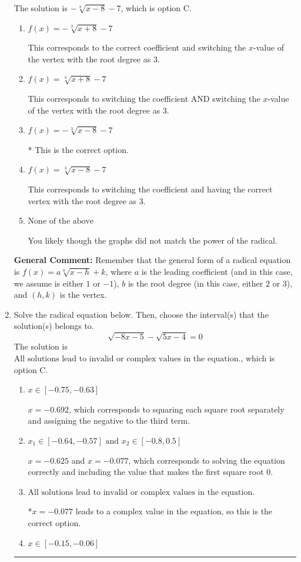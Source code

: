 \documentclass{extbook}[14pt]
\newcommand{\litem}[1]{\item #1

\rule{\textwidth}{0.4pt}}
\begin{document}
\begin{enumerate}
{The solution is \( - \sqrt[3]{x - 8} - 7 \), which is option C.\begin{enumerate}[label=\Alph*.]
\item \( f(x) = - \sqrt[3]{x + 8} - 7 \)

This corresponds to the correct coefficient and switching the $x$-value of the vertex with the root degree as $3$.
\item \( f(x) = \sqrt[3]{x + 8} - 7 \)

This corresponds to switching the coefficient AND switching the $x$-value of the vertex with the root degree as $3$.
\item \( f(x) = - \sqrt[3]{x - 8} - 7 \)

* This is the correct option.
\item \( f(x) = \sqrt[3]{x - 8} - 7 \)

This corresponds to switching the coefficient and having the correct vertex with the root degree as $3$.
\item \( \text{None of the above} \)

You likely though the graphs did not match the power of the radical.
\end{enumerate}

\textbf{General Comment:} Remember that the general form of a radical equation is $ f(x) = a \sqrt[b]{x - h} + k$, where $a$ is the leading coefficient (and in this case, we assume is either $1$ or $-1$), $b$ is the root degree (in this case, either $2$ or $3$), and $(h, k)$ is the vertex.
}
\litem{
Solve the radical equation below. Then, choose the interval(s) that the solution(s) belongs to.
\[ \sqrt{-8 x - 5} - \sqrt{5 x - 4} = 0 \]
The solution is \( \text{All solutions lead to invalid or complex values in the equation.} \), which is option C.\begin{enumerate}[label=\Alph*.]
\item \( x \in [-0.75,-0.63] \)

$x = -0.692$, which corresponds to squaring each square root separately and assigning the negative to the third term.
\item \( x_1 \in [-0.64, -0.57] \text{ and } x_2 \in [-0.8,0.5] \)

$x = -0.625$ and $x = -0.077$, which corresponds to solving the equation correctly and including the value that makes the first square root 0.
\item \( \text{All solutions lead to invalid or complex values in the equation.} \)

*$x = -0.077$ leads to a complex value in the equation, so this is the correct option.
\item \( x \in [-0.15,-0.06] \)


\end{enumerate}}
\end{enumerate}
\end{document}
